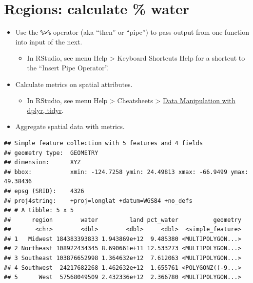 \documentclass[]{book}
\newenvironment{Shaded}{\begin{snugshade}}{\end{snugshade}}
\newcommand{\KeywordTok}[1]{\textcolor[rgb]{0.13,0.29,0.53}{\textbf{{#1}}}}
\newcommand{\DataTypeTok}[1]{\textcolor[rgb]{0.13,0.29,0.53}{{#1}}}
\newcommand{\DecValTok}[1]{\textcolor[rgb]{0.00,0.00,0.81}{{#1}}}
\newcommand{\StringTok}[1]{\textcolor[rgb]{0.31,0.60,0.02}{{#1}}}
\newcommand{\CommentTok}[1]{\textcolor[rgb]{0.56,0.35,0.01}{\textit{{#1}}}}
\newcommand{\NormalTok}[1]{{#1}}
\providecommand{\tightlist}{%
  \setlength{\itemsep}{0pt}\setlength{\parskip}{0pt}}
\theoremstyle{definition}
\theoremstyle{definition}
\theoremstyle{definition}
\theoremstyle{remark}
\begin{document}
\section{Regions: calculate \% water}\label{regions-calculate-water}

\begin{itemize}
\tightlist
\item
  Use the \texttt{\%\textgreater{}\%} operator (aka ``then'' or
  ``pipe'') to pass output from one function into input of the next.

  \begin{itemize}
  \tightlist
  \item
    In RStudio, see menu Help \textgreater{} Keyboard Shortcuts Help for
    a shortcut to the ``Insert Pipe Operator''.
  \end{itemize}
\item
  Calculate metrics on spatial attributes.

  \begin{itemize}
  \tightlist
  \item
    In RStudio, see menu Help \textgreater{} Cheatsheets \textgreater{}
    \href{https://github.com/rstudio/cheatsheets/raw/master/source/pdfs/data-transformation-cheatsheet.pdf}{Data
    Manipulation with dplyr, tidyr}.
  \end{itemize}
\item
  Aggregate spatial data with metrics.
\end{itemize}

\begin{Shaded}
\end{Shaded}

\begin{verbatim}
## Simple feature collection with 5 features and 4 fields
## geometry type:  GEOMETRY
## dimension:      XYZ
## bbox:           xmin: -124.7258 ymin: 24.49813 xmax: -66.9499 ymax: 49.38436
## epsg (SRID):    4326
## proj4string:    +proj=longlat +datum=WGS84 +no_defs
## # A tibble: 5 x 5
##      region        water         land pct_water          geometry
##       <chr>        <dbl>        <dbl>     <dbl>  <simple_feature>
## 1   Midwest 184383393833 1.943869e+12  9.485380 <MULTIPOLYGON...>
## 2 Northeast 108922434345 8.690661e+11 12.533273 <MULTIPOLYGON...>
## 3 Southeast 103876652998 1.364632e+12  7.612063 <MULTIPOLYGON...>
## 4 Southwest  24217682268 1.462632e+12  1.655761 <POLYGONZ((-9...>
## 5      West  57568049509 2.432336e+12  2.366780 <MULTIPOLYGON...>
\end{verbatim}
\end{document}
